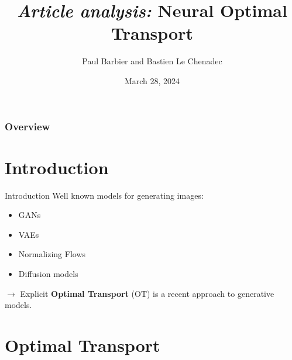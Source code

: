 \documentclass[aspectratio=169]{beamer}
\title[Generative Images]{\textit{Article analysis:} Neural Optimal Transport} %
\author{Paul Barbier and Bastien Le Chenadec} %
\institute[MVA, Ponts] %
\date{March 28, 2024} %
\begin{document}
\begin{frame}
    \titlepage%
\end{frame}

\begin{frame}
    \frametitle{Overview} %
    \tableofcontents %
\end{frame}


\section{Introduction}
\begin{frame}{Introduction}
    Well known models for generating images:
    \begin{itemize}
        \item GANs
        \item VAEs
        \item Normalizing Flows
        \item Diffusion models
    \end{itemize}

    $\rightarrow$ Explicit \textbf{Optimal Transport} (OT) is a recent approach to generative models.
\end{frame}

\section{Optimal Transport}
\end{document}
